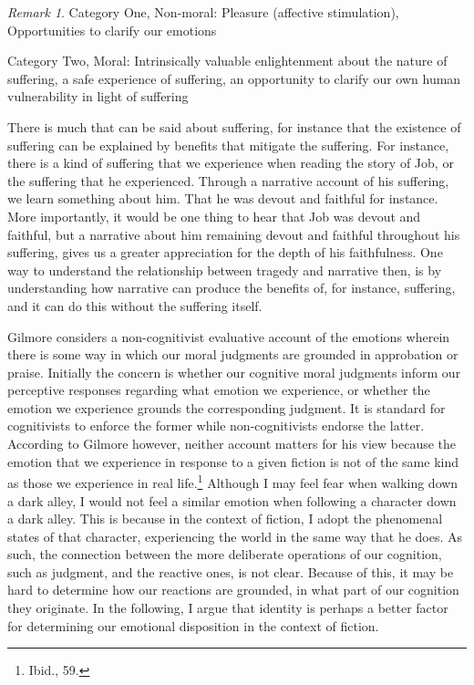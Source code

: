 \documentclass[phdthesis,12pt,final]{wuthesis}
\theoremstyle{definition}
\theoremstyle{definition}
\theoremstyle{definition}
\theoremstyle{definition}
\theoremstyle{remark}
\newtheorem*{remark}{Remark}
\begin{document}
\begin{remark}
Category One, Non-moral: Pleasure (affective stimulation), Opportunities to clarify our emotions

Category Two, Moral: Intrinsically valuable enlightenment about the nature of suffering, a safe experience of suffering, an opportunity to clarify our own human vulnerability in light of suffering
\end{remark}

There is much that can be said about suffering, for instance that the existence of suffering can be explained by benefits that mitigate the suffering. For instance, there is a kind of suffering that we experience when reading the story of Job, or the suffering that he experienced. Through a narrative account of his suffering, we learn something about him. That he was devout and faithful for instance. More importantly, it would be one thing to hear that Job was devout and faithful, but a narrative about him remaining devout and faithful throughout his suffering, gives us a greater appreciation for the depth of his faithfulness. One way to understand the relationship between tragedy and narrative then, is by understanding how narrative can produce the benefits of, for instance, suffering, and it can do this without the suffering itself.

Gilmore considers a non-cognitivist evaluative account of the emotions wherein there is some way in which our moral judgments are grounded in approbation or praise. Initially the concern is whether our cognitive moral judgments inform our perceptive responses regarding what emotion we experience, or whether the emotion we experience grounds the corresponding judgment. It is standard for cognitivists to enforce the former while non-cognitivists endorse the latter. According to Gilmore however, neither account matters for his view because the emotion that we experience in response to a given fiction is not of the same kind as those we experience in real life.\footnote{Ibid., 59.} Although I may feel fear when walking down a dark alley, I would not feel a similar emotion when following a character down a dark alley. This is because in the context of fiction, I adopt the phenomenal states of that character, experiencing the world in the same way that he does. As such, the connection between the more deliberate operations of our cognition, such as judgment, and the reactive ones, is not clear. Because of this, it may be hard to determine how our reactions are grounded, in what part of our cognition they originate. In the following, I argue that identity is perhaps a better factor for determining our emotional disposition in the context of fiction.
\end{document}
